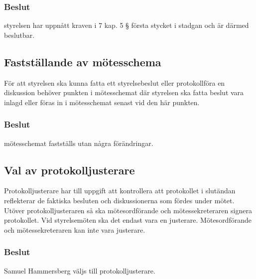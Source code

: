 \documentclass[protokoll]{dvd}
\begin{document}
        \subsubsection*{Beslut}

        \begin{attsatser}
            \item styrelsen har uppnått kraven i 7 kap. 5 § första stycket i stadgan och är därmed beslutbar.
        \end{attsatser}

    \subsection{Fastställande av mötesschema}

        För att styrelsen ska kunna fatta ett styrelsebeslut eller protokollföra en diskussion behöver punkten i mötesschemat där styrelsen ska fatta beslut vara inlagd eller föras in i mötesschemat senast vid den här punkten.

        \subsubsection*{Beslut}

        \begin{attsatser}
            \item mötesschemat fastställs utan några förändringar.
        \end{attsatser}


    \subsection{Val av protokolljusterare}

        Protokolljusterare har till uppgift att kontrollera att protokollet i slutändan reflekterar de faktiska besluten och diskussionerna som fördes under mötet.
        Utöver protokolljusteraren så ska mötesordförande och mötessekreteraren signera protokollet.
        Vid styrelsemöten ska det endast vara en justerare.
        Mötesordförande och mötessekreteraren kan inte vara justerare.

        \subsubsection*{Beslut}

        \begin{attsatser}
            \item Samuel Hammersberg väljs till protokolljusterare.
        \end{attsatser}
\end{document}
